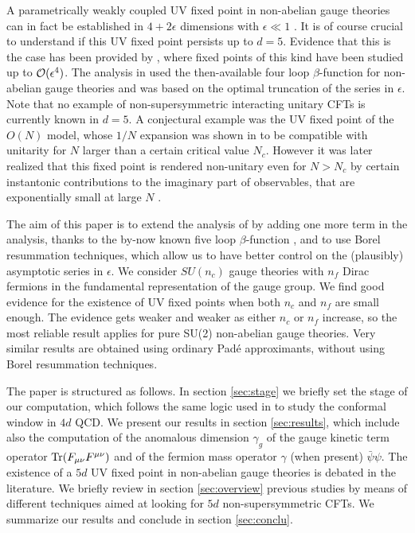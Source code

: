 \documentclass [11pt]{article}
\begin{document}
A parametrically weakly coupled UV fixed point in non-abelian gauge theories can in fact be established in $4+2\epsilon$ dimensions with $\epsilon \ll 1$ \cite{Peskin}.
 It is of course crucial to understand if this UV fixed point persists up to $d=5$. Evidence that this is the case has been provided by 
\cite{Morris_2005}, where fixed points of this kind have been studied up to ${\cal O}(\epsilon^4)$. The analysis in \cite{Morris_2005} used the then-available four loop $\beta$-function for non-abelian gauge theories and was based on the optimal truncation of the series in $\epsilon$.  Note that no example of non-supersymmetric interacting unitary CFTs is currently known in $d=5$. A conjectural example was the UV fixed point of the $O(N)$ model, whose $1/N$ expansion was shown in \cite{Fei:2014yja} to be compatible with unitarity for $N$ larger than a certain critical value $N_c$. However it was later realized that this fixed point is rendered non-unitary even for  $N>N_c$ by certain instantonic contributions to the imaginary part of observables, that are exponentially small at large $N$ \cite{Giombi:2019upv}. 

The aim of this paper is to extend the analysis of \cite{Morris_2005} by adding one more term in the analysis, thanks to the by-now known five loop $\beta$-function \cite{Baikov:2016tgj,Herzog:2017ohr,Luthe:2017ttg,Chetyrkin:2017bjc}, and to
use Borel resummation techniques, which allow us to have better control on the (plausibly) asymptotic series in $\epsilon$.
We consider $SU(n_c)$ gauge theories  with $n_f$ Dirac fermions in the fundamental representation of the gauge group.
We find good evidence for the existence of UV fixed points when both $n_c$ and $n_f$ are small enough. The evidence gets weaker and weaker as
either $n_c$ or $n_f$ increase, so the most reliable result applies for pure SU(2) non-abelian gauge theories. 
Very similar results are obtained using ordinary Pad\'e approximants, without using Borel resummation techniques.

The paper is structured as follows. In section \ref{sec:stage} we briefly set the stage of our computation, which follows the same logic used in \cite{DiPietro:2020jne} to study the conformal window in $4d$ QCD. We present our results in section \ref{sec:results}, which include also the computation of the anomalous dimension $\gamma_g$ of the gauge kinetic term operator ${\rm Tr} (F_{\mu \nu} F^{\mu \nu})$ and of the fermion mass operator  $\gamma$ (when present) $\bar \psi \psi$.
The existence of a $5d$ UV fixed point in non-abelian gauge theories is debated in the literature.
We briefly review in section \ref{sec:overview} previous studies  by means of different techniques aimed at looking for $5d$ non-supersymmetric CFTs.
We summarize our results and conclude in section \ref{sec:conclu}.
\end{document}

